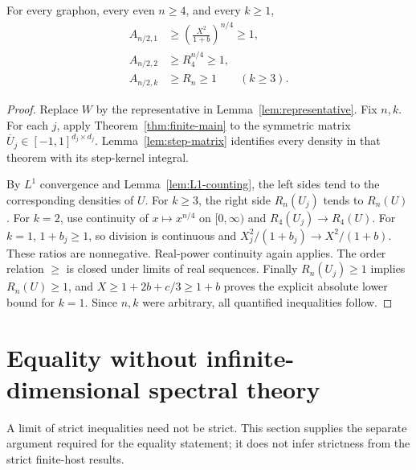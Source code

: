 \begin{theorem}
\label{thm:graphon-main}
\proved For every graphon, every even $n\ge4$, and every $k\ge1$,
\begin{align*}
 A_{n/2,1}&\ge\left(\frac{X^2}{1+b}\right)^{n/4}\ge1,\\
 A_{n/2,2}&\ge R_4^{n/4}\ge1,\\
 A_{n/2,k}&\ge R_n\ge1\qquad(k\ge3).
\end{align*}
\end{theorem}
\begin{proof}
Replace $W$ by the representative in Lemma~\ref{lem:representative}.  Fix $n,k$.
For each $j$, apply Theorem~\ref{thm:finite-main} to the symmetric matrix
$\overline U_j\in[-1,1]^{d_j\times d_j}$.  Lemma~\ref{lem:step-matrix} identifies every density
in that theorem with its step-kernel integral.

By $L^1$ convergence and Lemma~\ref{lem:L1-counting}, the left sides tend to the corresponding
densities of $U$.  For $k\ge3$, the right side $R_n(U_j)$ tends to $R_n(U)$.
For $k=2$, use continuity of $x\mapsto x^{n/4}$ on $[0,\infty)$ and $R_4(U_j)\to R_4(U)$.
For $k=1$, $1+b_j\ge1$, so division is continuous and
$X_j^2/(1+b_j)\to X^2/(1+b)$.  These ratios are nonnegative.  Real-power continuity again
applies.  The order relation $\ge$ is closed under limits of real sequences.
Finally $R_n(U_j)\ge1$ implies $R_n(U)\ge1$, and
$X\ge1+2b+c/3\ge1+b$ proves the explicit absolute lower bound for $k=1$.
Since $n,k$ were arbitrary, all quantified inequalities follow.
\end{proof}

\section{Equality without infinite-dimensional spectral theory}
\label{sec:equality}

A limit of strict inequalities need not be strict.  This section supplies the separate
argument required for the equality statement; it does not infer strictness from the strict
finite-host results.

